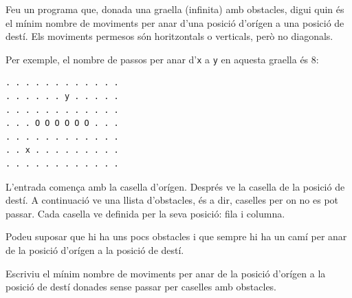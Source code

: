 

\Statement

Feu un programa que, donada una graella (infinita) amb obstacles, digui quin és el mínim nombre de moviments per anar d'una posició d'orígen a una posició de destí. Els moviments permesos són horitzontals o verticals, però no diagonals.

\medskip
Per exemple, el nombre de passos per anar d'\texttt{x} a \texttt{y} en aquesta graella és 8:

\begin{verbatim}
. . . . . . . . . . . . 
. . . . . . y . . . . . 
. . . . . . . . . . . . 
. . . O O O O O O . . . 
. . . . . . . . . . . . 
. . x . . . . . . . . . 
. . . . . . . . . . . . 
\end{verbatim}


\Input

L'entrada comença amb la casella d'orígen.
Després ve la casella de la posició de destí.
A continuació ve una llista d'obstacles, és a dir, caselles per on no es pot passar.
Cada casella ve definida per la seva posició: fila i columna.

\medskip

Podeu suposar que hi ha uns pocs obstacles i que sempre hi ha un camí per anar de la posició d'orígen a la posició de destí.

\Output

Escriviu el mínim nombre de moviments per anar de la posició d'orígen a la posició de destí donades sense passar per caselles amb obstacles.


\Sample
